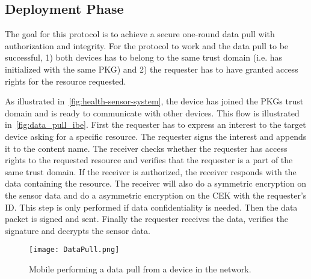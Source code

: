 



\subsection{Deployment Phase}\label{data_pull}
The goal for this protocol is to achieve a secure one-round \gls{data} pull with authorization and integrity.
For the protocol to work and the \gls{data} pull to be successful, 1) both devices has to belong to the same trust domain (i.e. has initialized with the same \gls{PKG}) and 2) the requester has to have granted access rights for the resource requested.

As illustrated in~\autoref{fig:health-sensor-system}, the device has joined the \gls{PKG}s trust domain and is ready to communicate with other devices.
This flow is illustrated in~\autoref{fig:data_pull_ibe}.
First the requester has to express an \gls{interest} to the target device asking for a specific resource. 
The requester signs the \gls{interest} and appends it to the content \gls{name}.
The \gls{receiver} checks whether the requester has access rights to the requested resource and verifies that the requester is a part of the same trust domain.
If the \gls{receiver} is authorized, the \gls{receiver} responds with the \gls{data} containing the resource. 
The \gls{receiver} will also do a symmetric encryption on the sensor \gls{data} and do a asymmetric encryption on the \gls{CEK} with the requester's \gls{ID}.
This step is only performed if \gls{data} confidentiality is needed. 
Then the \gls{data} packet is signed and sent.
Finally the requester receives the \gls{data}, verifies the signature and decrypts the sensor \gls{data}.

\begin{figure}[ht]
  \centering
  \texttt{[image: DataPull.png]}
  \caption{Mobile performing a data pull from a device in the network.}
  \label{fig:data_pull_ibe}
\end{figure}

